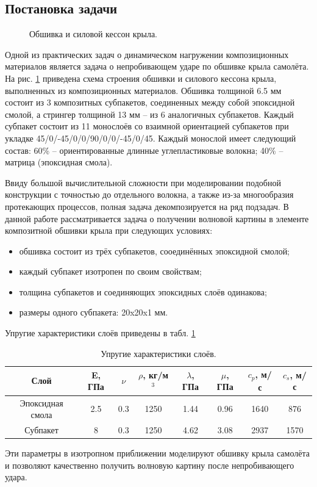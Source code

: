 \subsection*{Постановка задачи}
\begin{figure}[h]
\caption{Обшивка и силовой кессон крыла.}
\label{pic:construction}
\end{figure}
Одной из практических задач о динамическом нагружении композиционных материалов
является задача о непробивающем ударе по обшивке крыла самолёта. На рис.
\ref{pic:construction} приведена схема строения обшивки и силового кессона
крыла, выполненных из композиционных материалов. Обшивка толщиной 6.5 мм состоит 
из 3 композитных субпакетов, соединенных между собой эпоксидной смолой, 
а стрингер толщиной 13 мм -- из 6 аналогичных субпакетов. Каждый субпакет
состоит из 11 монослоёв со взаимной ориентацией субпакетов при укладке 
45/0/-45/0/0/90/0/0/-45/0/45. Каждый монослой имеет следующий состав: 60\% -- 
ориентированные длинные углепластиковые волокна; 40\% -- матрица
(эпоксидная смола). 

Ввиду большой вычислительной сложности при моделировании подобной конструкции с 
точностью до отдельного волокна, а также из-за многообразия протекающих процессов, 
полная задача декомпозируется на ряд подзадач. В данной работе рассматривается задача о получении
волновой картины в элементе композитной обшивки крыла при следующих условиях:
\begin{itemize}
\item обшивка состоит из трёх субпакетов, сооединённых эпоксидной смолой;
\item каждый субпакет изотропен по своим свойствам;
\item толщина субпакетов и соединяющих эпоксидных слоёв одинакова;
\item размеры одного субпакета: 20x20x1 мм.
\end{itemize}
Упругие характеристики слоёв приведены в табл. \ref{tbl:subpackage}
\begin{table}
\centering
\begin{tabular}{|c|c|c|c|c|c|c|c|}
\hline
Слой & E, ГПа & $\nu$ & $\rho$, кг/м$^{3}$ & $\lambda$, ГПа & $\mu$, ГПа &
$c_p$, м/с & $c_s$, м/с \\
\hline
Эпоксидная смола & 2.5 & 0.3 & 1250 & 1.44 & 0.96 & 1640 & 876 \\
Субпакет & 8 & 0.3 & 1250 & 4.62 & 3.08 & 2937 & 1570 \\
\hline
\end{tabular}
\caption{Упругие характеристики слоёв.}
\label{tbl:subpackage}
\end{table}
Эти параметры в изотропном приближении моделируют обшивку крыла самолёта и
позволяют качественно получить волновую картину после непробивающего удара.


